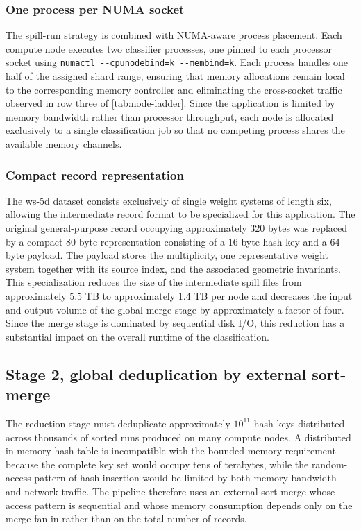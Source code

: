 \documentclass[appliedmath,article,submit,moreauthors]{Definitions/mdpi}
\begin{document}
\subsubsection{One process per NUMA socket}

The spill-run strategy is combined with NUMA-aware process placement. Each
compute node executes two classifier processes, one pinned to each processor
socket using \nolinkurl{numactl --cpunodebind=k --membind=k}. Each process
handles one half of the assigned shard range, ensuring that memory allocations
remain local to the corresponding memory controller and eliminating the
cross-socket traffic observed in row three of \cref{tab:node-ladder}. Since the
application is limited by memory bandwidth rather than processor throughput,
each node is allocated exclusively to a single classification job so that no
competing process shares the available memory channels.

\subsubsection{Compact record representation}

The ws-5d dataset consists exclusively of single weight systems of length six,
allowing the intermediate record format to be specialized for this application.
The original general-purpose record occupying approximately \(320\) bytes was
replaced by a compact \(80\)-byte representation consisting of a \(16\)-byte
hash key and a \(64\)-byte payload. The payload stores the multiplicity, one
representative weight system together with its source index, and the associated
geometric invariants. This specialization reduces the size of the intermediate
spill files from approximately \(5.5\) TB to approximately \(1.4\) TB per node
and decreases the input and output volume of the global merge stage by
approximately a factor of four. Since the merge stage is dominated by sequential
disk I/O, this reduction has a substantial impact on the overall runtime of the
classification.

\subsection{Stage 2, global deduplication by external sort-merge}
\label{sec:pipe-merge}

The reduction stage must deduplicate approximately \(10^{11}\) hash keys
distributed across thousands of sorted runs produced on many compute nodes. A
distributed in-memory hash table is incompatible with the bounded-memory
requirement because the complete key set would occupy tens of terabytes, while
the random-access pattern of hash insertion would be limited by both memory
bandwidth and network traffic. The pipeline therefore uses an external
sort-merge whose access pattern is sequential and whose memory consumption
depends only on the merge fan-in rather than on the total number of records.
\end{document}
